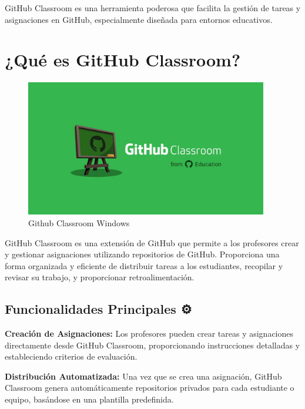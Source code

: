 \documentclass[
  a4paper,
  DIV=11,
  numbers=noendperiod,
  onepage,
  openany]{scrreprt}
\begin{document}
GitHub Classroom es una herramienta poderosa que facilita la gestión de
tareas y asignaciones en GitHub, especialmente diseñada para entornos
educativos.

\section{¿Qué es GitHub Classroom? 🤔}\label{quuxe9-es-github-classroom}

\begin{figure}[H]

{\centering \includegraphics[width=4.16667in,height=\textheight]{unidades/unidad1/../../images/github-classroom-ventana.jpg}

}

\caption{Github Classroom Windows}

\end{figure}%

GitHub Classroom es una extensión de GitHub que permite a los profesores
crear y gestionar asignaciones utilizando repositorios de GitHub.
Proporciona una forma organizada y eficiente de distribuir tareas a los
estudiantes, recopilar y revisar su trabajo, y proporcionar
retroalimentación.

\subsection{Funcionalidades Principales
⚙️}\label{funcionalidades-principales}

\textbf{Creación de Asignaciones:} Los profesores pueden crear tareas y
asignaciones directamente desde GitHub Classroom, proporcionando
instrucciones detalladas y estableciendo criterios de evaluación.

\textbf{Distribución Automatizada:} Una vez que se crea una asignación,
GitHub Classroom genera automáticamente repositorios privados para cada
estudiante o equipo, basándose en una plantilla predefinida.
\end{document}
